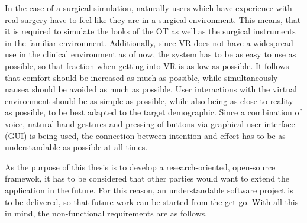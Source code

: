 In the case of a surgical simulation, naturally users which have experience with real surgery have to feel like they are in a surgical environment.
This means, that it is required to simulate the looks of the OT as well as the surgical instruments in the familiar environment.
Additionally, since VR does not have a widespread use in the clinical environment as of now, the system has to be as easy to use as possible, so that fraction when getting into VR is as low as possible.
It follows that comfort should be increased as much as possible, while simultaneously nausea should be avoided as much as possible.
User interactions with the virtual environment should be as simple as possible, while also being as close to reality as possible, to be best adapted to the target demographic.
Since a combination of voice, natural hand gestures and pressing of buttons via graphical user interface (GUI) is being used, the connection between intention and effect has to be as 
understandable as possible at all times.

As the purpose of this thesis is to develop a research-oriented, open-source framewok, it has to be considered that other parties would want to extend the application in the future.
For this reason, an understandable software project is to be delivered, so that future work can be started from the get go.
With all this in mind, the non-functional requirements are as follows.


